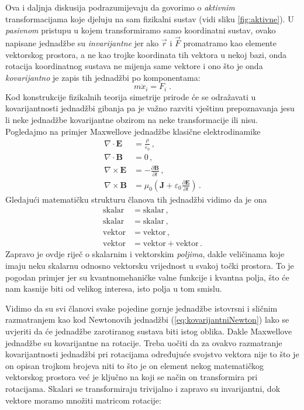 Ova i daljnja diskusija podrazumijevaju da govorimo o \emph{aktivnim}
transformacijama koje djeluju na sam fizikalni sustav (vidi
sliku \ref{fig:aktivne}). U \emph{pasivnom} 
pristupu u kojem transformiramo samo koordinatni sustav,
ovako napisane jednadžbe su \emph{invarijantne} jer
ako $\vec{r}$ i $\vec{F}$ promatramo kao elemente vektorskog prostora,
a ne kao trojke koordinata tih vektora u nekoj bazi, onda rotacija
koordinatnog sustava ne mijenja same vektore i ono što je onda
\emph{kovarijantno} je zapis tih jednadžbi po komponentama:
\begin{equation}
       m  \ddot{x}_{i} =  F_{i} \;.
\end{equation}
 
Kod konstrukcije fizikalnih teorija simetrije prirode će se odražavati
u kovarijantnosti jednadžbi gibanja pa je
važno razviti vještinu prepoznavanja jesu li neke jednadžbe
kovarijantne obzirom na neke transformacije ili nisu. Pogledajmo na primjer
Maxwellove jednadžbe klasične elektrodinamike
 
\begin{align}
    \nabla \cdot \mathbf{E}  &= \frac{\rho}{\varepsilon_0} \,, \label{eq:maxwell1} \\
\nabla \cdot \mathbf{B}  &= 0 \,, \\
\nabla \times \mathbf{E} &= -\frac{\partial \mathbf{B}}{\partial t}  \,,\\
\nabla \times \mathbf{B} &= \mu_0 \left(\mathbf{J} + 
    \varepsilon_0  \frac{\partial \mathbf{E}}{\partial t} \right) \,. \label{eq:maxwell4}
\end{align}
Gledajući matematičku strukturu članova tih jednadžbi vidimo da je ona
\begin{align*}
    \text{skalar} &= \text{skalar} \,, \\
    \text{skalar} &= \text{skalar}  \,,\\
    \text{vektor} &= \text{vektor}  \,,\\
    \text{vektor} &= \text{vektor} + \text{vektor} \,.
\end{align*}
Zapravo je ovdje riječ o skalarnim i vektorskim \emph{poljima}, dakle veličinama
koje imaju neku skalarnu odnosno vektorsku vrijednost u svakoj točki prostora.
To je pogodan primjer jer su kvantnomehaničke valne funkcije
i kvantna polja, što će nam kasnije biti od velikog interesa, isto polja u tom smislu.

Vidimo da su svi članovi svake pojedine gornje jednadžbe istovrsni i sličnim
razmatranjem kao kod
Newtonovih jednadžbi (\ref{eq:kovarijantniNewton}) lako se uvjeriti da
će jednadžbe zarotiranog
sustava biti istog oblika. Dakle Maxwellove jednadžbe su kovarijantne
na rotacije.
Treba uočiti da za ovakvo razmatranje kovarijantnosti jednadžbi pri rotacijama određujuće svojstvo 
vektora nije to što je on opisan trojkom brojeva niti
to što je on element nekog matematičkog vektorskog prostora već je ključno na koji
se način on transformira pri rotacijama. Skalari se transformiraju trivijalno i
zapravo su invarijantni, dok vektore moramo množiti matricom rotacije:

